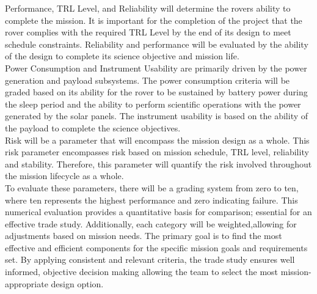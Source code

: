 Performance, TRL Level, and Reliability will determine the rovers ability to complete the mission. It is important for the completion of the project that the rover complies with the required TRL Level by the end of its design to meet schedule constraints. Reliability and performance will be evaluated by the ability of the design to complete its science objective and mission life.\\

Power Consumption and Instrument Usability are primarily driven by the power generation and payload subsystems. The power consumption criteria will be graded based on its ability for the rover to be sustained by battery power during the sleep period and the ability to perform scientific operations with the power generated by the solar panels. The instrument usability is based on the ability of the payload to complete the science objectives.\\

Risk will be a parameter that will encompass the mission design as a whole. This risk parameter encompasses risk based on mission schedule, TRL level, reliability and stability. Therefore, this parameter will quantify the risk involved throughout the mission lifecycle as a whole.\\

To evaluate these parameters, there will be a grading system from zero to ten, where ten represents the highest performance and zero indicating failure. This numerical evaluation provides a quantitative basis for comparison; essential for an effective trade study. Additionally, each category will be weighted,allowing for adjustments based on mission needs. The primary goal is to find the most effective and efficient components for the specific mission goals and requirements set. By applying consistent and relevant criteria, the trade study ensures well informed, objective decision making allowing the team to select the most mission-appropriate design option.\\

 